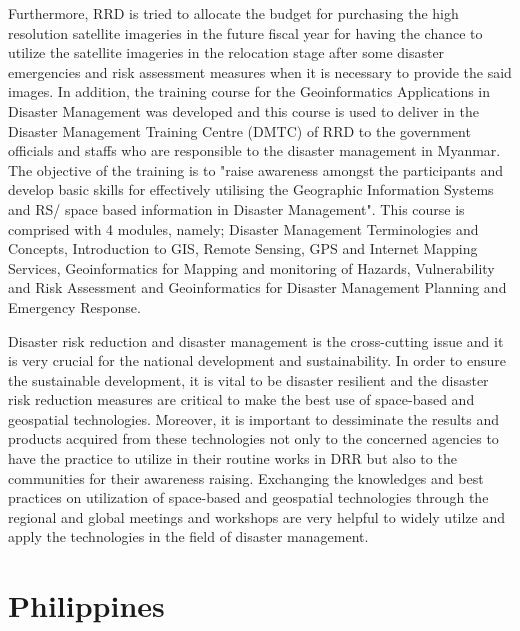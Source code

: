 {\vspace{0.4 cm}
  
Furthermore, RRD is tried to allocate the budget for purchasing the high resolution satellite imageries in the future fiscal year for having the chance to utilize the satellite imageries in the relocation stage after some disaster emergencies and risk assessment measures when it is necessary to provide the said images. In addition, the training course for the Geoinformatics Applications in Disaster Management was developed and this course is used to deliver in the Disaster Management Training Centre (DMTC) of RRD to the government officials and staffs who are responsible to the disaster management in Myanmar. The objective of the training is to "raise awareness amongst the participants and develop basic skills for effectively utilising the Geographic Information Systems and RS/ space based information in Disaster Management". This course is comprised with 4 modules, namely; Disaster Management Terminologies and Concepts, Introduction to GIS, Remote Sensing, GPS and Internet Mapping Services, Geoinformatics for Mapping and monitoring of Hazards, Vulnerability and Risk Assessment and Geoinformatics for Disaster Management Planning and Emergency Response.
		
\vspace{0.4 cm}
  
Disaster risk reduction and disaster management is the cross-cutting issue and it is very crucial for the national development and sustainability. In order to ensure the sustainable development, it is vital to be disaster resilient and the disaster risk reduction measures are critical to make the best use of space-based and geospatial technologies. Moreover, it is important to dessiminate the results and products acquired from these technologies not only to the concerned agencies to have the practice to utilize in their routine works in DRR but also to the communities for their awareness raising. Exchanging the knowledges and best practices on utilization of space-based and geospatial technologies through the regional and global meetings and workshops are very helpful to widely utilze and apply the technologies in the field of disaster management.
\par}


\section{Philippines}

\vspace{0.5 cm}

